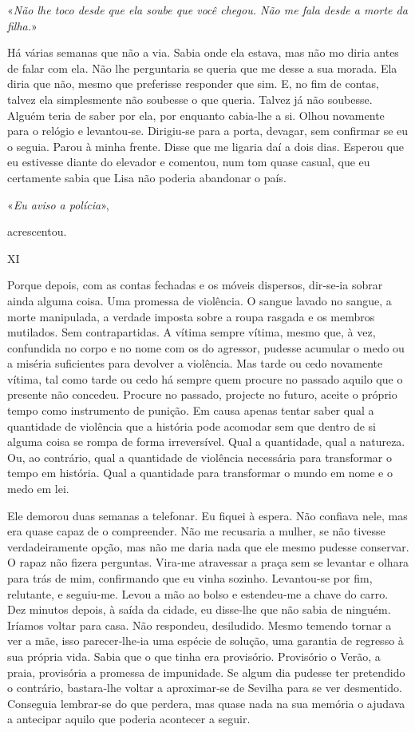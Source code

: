 «\emph{Não lhe toco desde que ela soube que você chegou. Não me fala
desde a morte da filha.}»

Há várias semanas que não a via. Sabia onde ela estava, mas não mo diria
antes de falar com ela. Não lhe perguntaria se queria que me desse a sua
morada. Ela diria que não, mesmo que preferisse responder que sim. E, no
fim de contas, talvez ela simplesmente não soubesse o que queria. Talvez
já não soubesse. Alguém teria de saber por ela, por enquanto cabia­‑lhe
a si. Olhou novamente para o relógio e levantou­‑se. Dirigiu­‑se para a
porta, devagar, sem confirmar se eu o seguia. Parou à minha frente.
Disse que me ligaria daí a dois dias. Esperou que eu estivesse diante do
elevador e comentou, num tom quase casual, que eu certamente sabia que
Lisa não poderia abandonar o país.

«\emph{Eu aviso a polícia}»,

acrescentou.

XI

Porque depois, com as contas fechadas e os móveis dispersos, dir­‑se­‑ia
sobrar ainda alguma coisa. Uma promessa de violência. O sangue lavado no
sangue, a morte manipulada, a verdade imposta sobre a roupa rasgada e os
membros mutilados. Sem contrapartidas. A vítima sempre vítima, mesmo
que, à vez, confundida no corpo e no nome com os do agressor, pudesse
acumular o medo ou a miséria suficientes para devolver a violência. Mas
tarde ou cedo novamente vítima, tal como tarde ou cedo há sempre quem
procure no passado aquilo que o presente não concedeu. Procure no
passado, projecte no futuro, aceite o próprio tempo como instrumento de
punição. Em causa apenas tentar saber qual a quantidade de violência que
a história pode acomodar sem que dentro de si alguma coisa se rompa de
forma irreversível. Qual a quantidade, qual a natureza. Ou, ao
contrário, qual a quantidade de violência necessária para transformar o
tempo em história. Qual a quantidade para transformar o mundo em nome e
o medo em lei.

Ele demorou duas semanas a telefonar. Eu fiquei à espera. Não confiava
nele, mas era quase capaz de o compreender. Não me recusaria a mulher,
se não tivesse verdadeiramente opção, mas não me daria nada que ele
mesmo pudesse conservar. O rapaz não fizera perguntas. Vira­‑me
atravessar a praça sem se levantar e olhara para trás de mim,
confirmando que eu vinha sozinho. Levantou­‑se por fim, relutante, e
seguiu­‑me. Levou a mão ao bolso e estendeu­‑me a chave do carro. Dez
minutos depois, à saída da cidade, eu disse­‑lhe que não sabia de
ninguém. Iríamos voltar para casa. Não respondeu, desiludido. Mesmo
temendo tornar a ver a mãe, isso parecer­‑lhe­‑ia uma espécie de
solução, uma garantia de regresso à sua própria vida. Sabia que o que
tinha era provisório. Provisório o Verão, a praia, provisória a promessa
de impunidade. Se algum dia pudesse ter pretendido o contrário,
bastara­‑lhe voltar a aproximar­‑se de Sevilha para se ver desmentido.
Conseguia lembrar­‑se do que perdera, mas quase nada na sua memória o
ajudava a antecipar aquilo que poderia acontecer a seguir.

